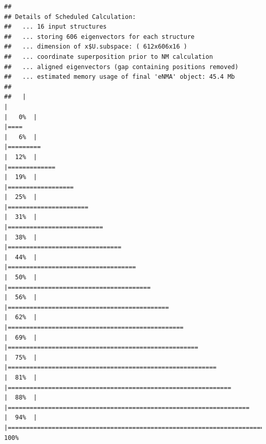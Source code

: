 \documentclass[
]{article}
\begin{document}
\begin{verbatim}
## 
## Details of Scheduled Calculation:
##   ... 16 input structures 
##   ... storing 606 eigenvectors for each structure 
##   ... dimension of x$U.subspace: ( 612x606x16 )
##   ... coordinate superposition prior to NM calculation 
##   ... aligned eigenvectors (gap containing positions removed)  
##   ... estimated memory usage of final 'eNMA' object: 45.4 Mb 
## 
##   |                                                                              |                                                                      |   0%  |                                                                              |====                                                                  |   6%  |                                                                              |=========                                                             |  12%  |                                                                              |=============                                                         |  19%  |                                                                              |==================                                                    |  25%  |                                                                              |======================                                                |  31%  |                                                                              |==========================                                            |  38%  |                                                                              |===============================                                       |  44%  |                                                                              |===================================                                   |  50%  |                                                                              |=======================================                               |  56%  |                                                                              |============================================                          |  62%  |                                                                              |================================================                      |  69%  |                                                                              |====================================================                  |  75%  |                                                                              |=========================================================             |  81%  |                                                                              |=============================================================         |  88%  |                                                                              |==================================================================    |  94%  |                                                                              |======================================================================| 100%
\end{verbatim}
\end{document}
